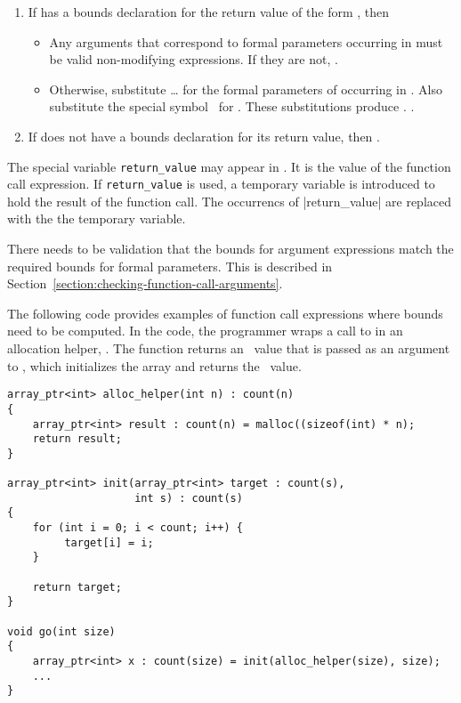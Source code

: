 \begin{enumerate}
\item
  If  has a bounds declaration for the return value of the form
   , then

  \begin{itemize}
  \item
    Any arguments that correspond to formal parameters occurring in
     must be valid non-modifying expressions. If they are
    not, .
  \item
    Otherwise, substitute  \ldots{}  for the formal
    parameters of  occurring in . Also substitute the
    special symbol \exprcurrentvalue\ for
    . These substitutions produce .
    .
  \end{itemize}
\item
  If  does not have a bounds declaration for its return value,
  then .
\end{enumerate}

The special variable \lstinline|return_value| may appear in . It
is the value of the function call expression. If \lstinline|return_value|
is used, a temporary variable is introduced to hold the result of the
function call.  The occurrencs of \lstinlne|return_value| are replaced
with the the temporary variable.

There needs to be validation that the bounds for argument expressions
match the required bounds for formal parameters. This is described in
Section~\ref{section:checking-function-call-arguments}.

The following code provides examples of function call expressions where
bounds need to be computed. In the code, the programmer wraps a call to
 in an allocation helper, . The
function  returns an \arrayptr\ value
that is passed as an argument to , which initializes the array
and returns the \arrayptr\ value.
\begin{lstlisting}
array_ptr<int> alloc_helper(int n) : count(n)
{
    array_ptr<int> result : count(n) = malloc((sizeof(int) * n);
    return result;
}

array_ptr<int> init(array_ptr<int> target : count(s), 
                    int s) : count(s)
{
    for (int i = 0; i < count; i++) {
         target[i] = i;
    }

    return target;
}

void go(int size) 
{
    array_ptr<int> x : count(size) = init(alloc_helper(size), size);
    ...
}
\end{lstlisting}


